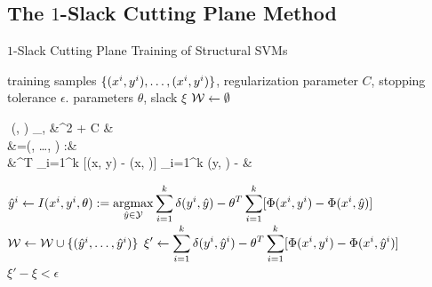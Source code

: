\subsection{The $1$-Slack Cutting Plane Method}

\begin{algorithm*}[t]
    \caption{$1$-Slack Cutting Plane Training of Structural SVMs \label{alg_one_slack}}
    \begin{algorithmic}[1]
        \Require training samples $\{ (x^{i}, y^{i}), \dots, (x^{i}, y^{i})\}$, regularization parameter $C$, stopping tolerance $\epsilon$.
        \Ensure parameters $\theta$, slack $\xi$
        \State $\mathcal{W} \leftarrow \emptyset$
        \Repeat
            \State 
            \vspace{-5mm}
            \begin{flalign*}
                \quad\,\,(\theta, \xi) \leftarrow \displaystyle \argmin_{\theta, \xi}&^2 + C \xi&\\
                &\forall {}=(, \dots, ) \in \W:&\\
                            &\theta^T \sum_{i=1}^k [\Phi(x, y) - \Phi(x, )] \geq \sum_{i=1}^k \delta(y, ) - \xi&
            \end{flalign*}
                \State
                $\hat{y}^{i} \leftarrow I(x^{i}, y^{i}, \theta) := \displaystyle \operatorname*{argmax}_{\hat{y}\in\mathcal{Y}} \sum_{i=1}^k \delta(y^{i}, \hat{y}) - \theta^T \sum_{i=1}^k [\Phi(x^{i}, y^{i}) - \Phi(x^{i}, \hat{y})]$ \label{get_cutting_plane}
            \EndFor
            \State $\mathcal{W} \leftarrow \mathcal{W} \cup \{ (\hat{y}^{i}, \dots, \hat{y}^{i}) \} $
            \State $ \displaystyle \xi' \leftarrow  \sum_{i=1}^k \delta(y^{i}, \hat{y}^{i}) - \theta^T \sum_{i=1}^k [\Phi(x^{i}, y^{i}) - \Phi(x^{i}, \hat{y}^{i})] $
        \Until $\xi' - \xi < \epsilon$ \label{convergence_check}
    \end{algorithmic}
\end{algorithm*}

